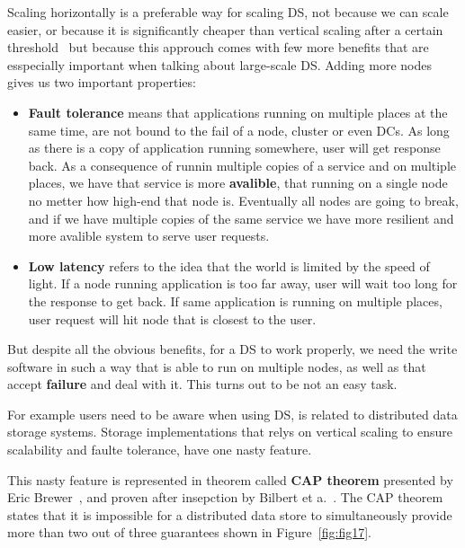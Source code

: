 Scaling horizontally is a preferable way for scaling DS, not because we can scale easier, or because it is significantly cheaper than vertical scaling after a certain threshold~\cite{Bondi00} but because this approuch comes with few more benefits that are esspecially important when talking about large-scale DS. Adding more nodes gives us two important properties: 

\begin{itemize}
	\item \textbf{Fault tolerance} means that applications running on multiple places at the same time, are not bound to the fail of a node, cluster or even DCs. As long as there is a copy of application running somewhere, user will get response back. As a consequence of runnin multiple copies of a service and on multiple places, we have that service is more \textbf{avalible}, that running on a single node no metter how high-end that node is. Eventually all nodes are going to break, and if we have multiple copies of the same service we have more resilient and more avalible system to serve user requests.
	\item \textbf{Low latency} refers to the idea that the world is limited by the speed of light. If a node running application is too far away, user will wait too long for the response to get back. If same application is running on multiple places, user request will hit node that is closest to the user.
\end{itemize}

But despite all the obvious benefits, for a DS to work properly, we need the write software in such a way that is able to run on multiple nodes, as well as that accept \textbf{failure} and deal with it. This turns out to be not an easy task.

For example users need to be aware when using DS, is related to distributed data storage systems. Storage implementations that relys on vertical scaling to ensure scalability and faulte tolerance, have one nasty feature. 

This nasty feature is represented in theorem called \textbf{CAP theorem} presented by Eric Brewer~\cite{Brewer2000}, and proven after insepction by Bilbert et a.~\cite{GilbertL02}. The CAP theorem states that it is impossible for a distributed data store to simultaneously provide more than two out of three guarantees shown in Figure~\ref{fig:fig17}.

